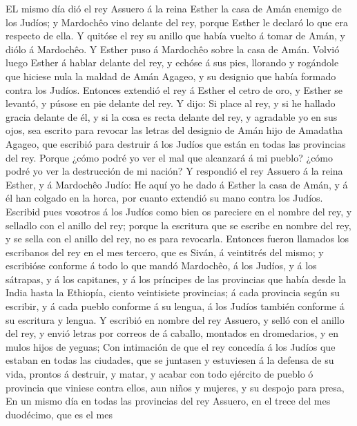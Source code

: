  EL mismo día dió el rey Assuero á la reina Esther la casa
de Amán enemigo de los Judíos; y Mardochêo vino delante del rey, porque
Esther le declaró lo que era respecto de ella.  Y quitóse
el rey su anillo que había vuelto á tomar de Amán, y diólo á Mardochêo.
Y Esther puso á Mardochêo sobre la casa de Amán.  Volvió
luego Esther á hablar delante del rey, y echóse á sus pies, llorando y
rogándole que hiciese nula la maldad de Amán Agageo, y su designio que
había formado contra los Judíos.  Entonces extendió el rey
á Esther el cetro de oro, y Esther se levantó, y púsose en pie delante
del rey.  Y dijo: Si place al rey, y si he hallado gracia
delante de él, y si la cosa es recta delante del rey, y agradable yo en
sus ojos, sea escrito para revocar las letras del designio de Amán hijo
de Amadatha Agageo, que escribió para destruir á los Judíos que están en
todas las provincias del rey.  Porque ¿cómo podré yo ver
el mal que alcanzará á mi pueblo? ¿cómo podré yo ver la destrucción de
mi nación?  Y respondió el rey Assuero á la reina Esther,
y á Mardochêo Judío: He aquí yo he dado á Esther la casa de Amán, y á él
han colgado en la horca, por cuanto extendió su mano contra los Judíos.
 Escribid pues vosotros á los Judíos como bien os
pareciere en el nombre del rey, y selladlo con el anillo del rey; porque
la escritura que se escribe en nombre del rey, y se sella con el anillo
del rey, no es para revocarla.  Entonces fueron llamados
los escribanos del rey en el mes tercero, que es Siván, á veintitrés del
mismo; y escribióse conforme á todo lo que mandó Mardochêo, á los
Judíos, y á los sátrapas, y á los capitanes, y á los príncipes de las
provincias que había desde la India hasta la Ethiopía, ciento
veintisiete provincias; á cada provincia según su escribir, y á cada
pueblo conforme á su lengua, á los Judíos también conforme á su
escritura y lengua.  Y escribió en nombre del rey
Assuero, y selló con el anillo del rey, y envió letras por correos de á
caballo, montados en dromedarios, y en mulos hijos de yeguas;
 Con intimación de que el rey concedía á los Judíos que
estaban en todas las ciudades, que se juntasen y estuviesen á la defensa
de su vida, prontos á destruir, y matar, y acabar con todo ejército de
pueblo ó provincia que viniese contra ellos, aun niños y mujeres, y su
despojo para presa,  En un mismo día en todas las
provincias del rey Assuero, en el trece del mes duodécimo, que es el mes
